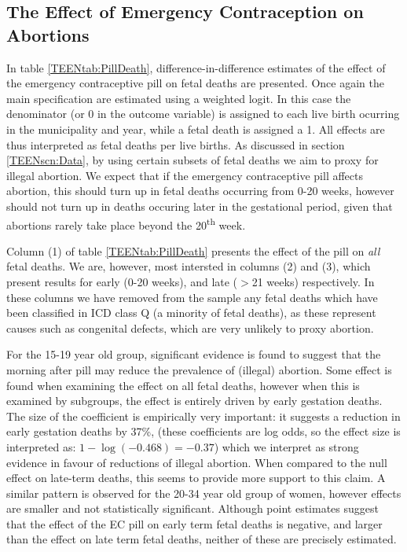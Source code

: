 \subsection{The Effect of Emergency Contraception on Abortions}
\label{TEENsscn:rabortion}
In table \ref{TEENtab:PillDeath}, difference-in-difference estimates of the 
effect of the emergency contraceptive pill on fetal deaths are presented.  Once
again the main specification are estimated using a weighted logit. In this case 
the denominator (or 0 in the outcome variable) is assigned to each live birth
ocurring in the municipality and year, while a fetal death is assigned a 1. All 
effects are thus interpreted as fetal deaths per live births. As discussed in 
section \ref{TEENscn:Data}, by using certain subsets of fetal deaths we aim to 
proxy for illegal abortion.  We expect that if the emergency contraceptive pill 
affects abortion, this should turn up in fetal deaths occurring from 0-20 weeks, 
however should not turn up in deaths occuring later in the gestational period, 
given that abortions rarely take place beyond the 20\textsuperscript{th} week.

Column (1) of table \ref{TEENtab:PillDeath} presents the effect of the pill on
\emph{all} fetal deaths.  We are, however, most intersted in columns (2) and (3),
which present results for early (0-20 weeks), and late ($>$21 weeks) 
respectively.  In these columns we have removed from the sample any fetal deaths
which have been classified in ICD class Q (a minority of fetal deaths), as these 
represent causes such as congenital defects, which are very unlikely to proxy
abortion.

For the 15-19 year old group, significant evidence is found to suggest that 
the morning after pill may reduce the prevalence of (illegal) abortion.  Some
effect is found when examining the effect on all fetal deaths, however when 
this is examined by subgroups, the effect is entirely driven by early gestation
deaths.  The size of the coefficient is empirically very important: it 
suggests a reduction in early gestation deaths by 37\%, (these coefficients are
log odds, so the effect size is interpreted as: $1-\log(-0.468)=-0.37$) which we 
interpret as strong evidence in favour of reductions of illegal abortion.  When 
compared to the null effect on late-term deaths, this seems to provide more 
support to this claim. A similar pattern is observed for the 20-34 year old group 
of women, however effects are smaller and not statistically significant. Although
point estimates suggest that the effect of the EC pill on early term fetal deaths
is negative, and larger than the effect on late term fetal deaths, neither of 
these are precisely estimated.

